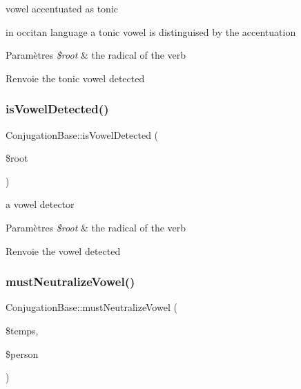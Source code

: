 vowel accentuated as tonic 

in occitan language a tonic vowel is distinguised by the accentuation


\begin{DoxyParams}{Paramètres}
{\em \$root} & the radical of the verb \\
\hline
\end{DoxyParams}
\begin{DoxyReturn}{Renvoie}
the tonic vowel detected 
\end{DoxyReturn}
\hypertarget{classConjugationBase_af8a92808eec27a866fe83fe64ba10784}{}\label{classConjugationBase_af8a92808eec27a866fe83fe64ba10784} 
\subsubsection{\texorpdfstring{is\+Vowel\+Detected()}{isVowelDetected()}}
{\footnotesize\ttfamily Conjugation\+Base\+::is\+Vowel\+Detected (\begin{DoxyParamCaption}\item[{}]{\$root }\end{DoxyParamCaption})\hspace{0.3cm}{\ttfamily [protected]}}



a vowel detector 


\begin{DoxyParams}{Paramètres}
{\em \$root} & the radical of the verb \\
\hline
\end{DoxyParams}
\begin{DoxyReturn}{Renvoie}
the vowel detected 
\end{DoxyReturn}
\hypertarget{classConjugationBase_aeaff0cedbe91b8a5cd534401d3b3ed74}{}\label{classConjugationBase_aeaff0cedbe91b8a5cd534401d3b3ed74} 
\subsubsection{\texorpdfstring{must\+Neutralize\+Vowel()}{mustNeutralizeVowel()}}
{\footnotesize\ttfamily Conjugation\+Base\+::must\+Neutralize\+Vowel (\begin{DoxyParamCaption}\item[{}]{\$temps,  }\item[{}]{\$person }\end{DoxyParamCaption})\hspace{0.3cm}{\ttfamily [protected]}}



